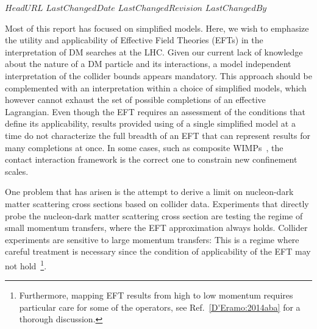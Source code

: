 \svnidlong
{$HeadURL$}
{$LastChangedDate$}
{$LastChangedRevision$}
{$LastChangedBy$}



Most of this report has focused on simplified models.
Here, we wish to emphasize the utility and applicability of
Effective Field Theories (EFTs) 
in the interpretation of DM searches at the LHC.
Given our current lack of knowledge about the nature of a DM particle and
its interactions, a model independent interpretation of the collider bounds
appears mandatory. This approach should be complemented with
an interpretation within a choice of simplified models, which however
cannot exhaust the set of possible completions of
an effective Lagrangian. 
Even though the EFT requires an assessment of the conditions that define its applicability, 
results provided using of a single simplified model at a time do not
characterize the full breadth of an EFT that can represent results for many completions at once.  
In some cases, such as composite WIMPs~\cite{}, 
the contact interaction framework is the correct one to constrain new confinement scales. 


One problem that has arisen is the attempt to derive a limit on
nucleon-dark matter scattering cross sections based on collider data.
Experiments that directly probe the nucleon-dark matter scattering cross section 
are testing the regime of small momentum transfers, where the EFT approximation always holds.  
Collider experiments are sensitive to large momentum transfers: This is a regime where careful 
treatment is necessary since the condition of applicability of the EFT may not hold~\footnote{
Furthermore, mapping EFT results from high to low momentum requires particular care for some of the operators, 
see Ref.~\ref{D'Eramo:2014aba} for a thorough discussion.}.

